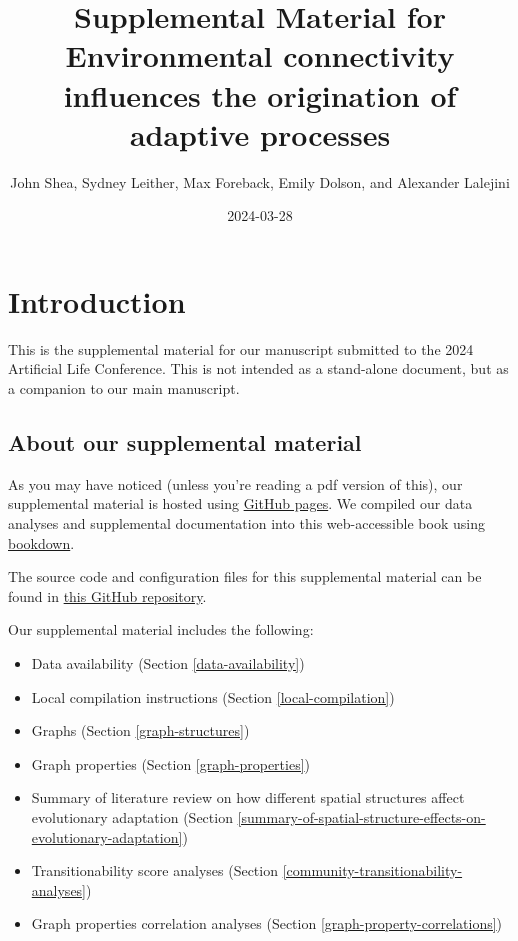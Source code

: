 \documentclass[
]{book}
\title{Supplemental Material for Environmental connectivity influences the origination of adaptive processes}
\author{John Shea, Sydney Leither, Max Foreback, Emily Dolson, and Alexander Lalejini}
\date{2024-03-28}
\providecommand{\tightlist}{%
  \setlength{\itemsep}{0pt}\setlength{\parskip}{0pt}}
\begin{document}
\maketitle

{
\setcounter{tocdepth}{1}
\tableofcontents
}
\hypertarget{introduction}{%
\chapter{Introduction}\label{introduction}}

This is the supplemental material for our manuscript submitted to the 2024 Artificial Life Conference.
This is not intended as a stand-alone document, but as a companion to our main manuscript.

\hypertarget{about-our-supplemental-material}{%
\section{About our supplemental material}\label{about-our-supplemental-material}}

As you may have noticed (unless you're reading a pdf version of this), our supplemental material is hosted using \href{https://pages.github.com/}{GitHub pages}.
We compiled our data analyses and supplemental documentation into this web-accessible book using \href{https://bookdown.org}{bookdown}.

The source code and configuration files for this supplemental material can be found in \href{https://github.com/amlalejini/alife-2024-spatial-chem-eco}{this GitHub repository}.

Our supplemental material includes the following:

\begin{itemize}
\tightlist
\item
  Data availability
  (Section \ref{data-availability})
\item
  Local compilation instructions
  (Section \ref{local-compilation})
\item
  Graphs
  (Section \ref{graph-structures})
\item
  Graph properties
  (Section \ref{graph-properties})
\item
  Summary of literature review on how different spatial structures affect evolutionary adaptation
  (Section \ref{summary-of-spatial-structure-effects-on-evolutionary-adaptation})
\item
  Transitionability score analyses
  (Section \ref{community-transitionability-analyses})
\item
  Graph properties correlation analyses
  (Section \ref{graph-property-correlations})
\end{itemize}
\end{document}
